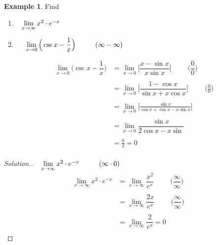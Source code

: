 \documentclass[11pt,a4paper]{article}
\theoremstyle{definition}
\newtheorem{exa}[thm]{Example}
\newenvironment{solution}
  {\renewcommand{\qedsymbol}{}\begin{proof}[\textit{Solution}.]}
  {\end{proof}}
\begin{document}
\begin{exa}
Find
\begin{enumerate}
\item $\hspace{0.3cm}\lim\limits_{x\rightarrow \infty}x^2\cdot e^{-x}$
\item $\hspace{0.5cm}\lim\limits_{x\rightarrow 0} \Big(\csc x - \dfrac{1}{x}\Big)\hspace{1cm} (\infty- \infty)$

\begin{align*}
\lim\limits_{x\rightarrow 0} \Big(\csc x - \dfrac{1}{x}\Big) & = \lim\limits_{x\rightarrow 0}\Bigg[\dfrac{x - \sin x}{x\sin x}\Bigg]\hspace{1cm} \Bigg(\dfrac{0}{0}\Bigg)\\\\
& = \lim\limits_{x\rightarrow 0}\Bigg[\dfrac{1 - \cos x}{\sin x + x\cos x }\Bigg]\hspace{1cm} \Bigg(\frac{0}{0}\Bigg)\\\\
& = \lim\limits_{x\rightarrow 0}\Bigg[\frac{\sin x}{\cos x + \cos x - x \sin x}\Bigg]\\\\
& = \lim\limits_{x\rightarrow 0}\dfrac{\sin x}{2\cos x - x\sin}\\\\
& = \frac{0}{2} = 0\\
\end{align*}
\end{enumerate}
\end{exa}

\begin{solution}
$\hspace{0.3cm}\lim\limits_{x\rightarrow \infty}x^2\cdot e^{-x} \hspace{1cm}  (\infty \cdot 0)$
\begin{align*}
\lim\limits_{x\rightarrow \infty}x^2\cdot e^{-x} & = \lim\limits_{x\rightarrow \infty} \dfrac{x^2}{e^x}\hspace{1cm} \Big(\dfrac{\infty}{\infty}\Big)\\\\
& = \lim\limits_{x\rightarrow \infty}\dfrac{2x}{e^x}\hspace{1cm} \Big(\dfrac{\infty}{\infty}\Big)\\\\
& = \lim\limits_{x\rightarrow \infty} \dfrac{2}{e^x} = 0\\
\end{align*}
\end{solution}
\end{document}
